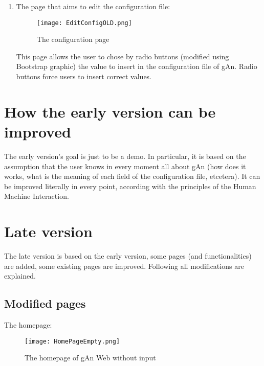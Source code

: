 \begin{enumerate}
\item The page that aims to edit the configuration file:

\begin{figure}[H]
\centering
\texttt{[image: EditConfigOLD.png]} %
\caption{The configuration page}
\end{figure}   

This page allows the user to chose by radio buttons (modified using Bootstrap graphic) the value to insert in the configuration file of gAn. Radio buttons force users to insert correct values.    

\end{enumerate}

\section{How the early version can be improved}
The early version's goal is just to be a demo. In particular, it is based on the assumption that the user knows in every moment all about gAn (how does it works,  what is the meaning of each field of the configuration file, etcetera). It can be improved literally in every point, according with the principles of the Human Machine Interaction.


\section{Late version}

The late version is based on the early version, some pages (and functionalities) are added, some existing pages are improved. Following all modifications are explained.

\subsection{Modified pages}
The homepage:

\begin{figure}[H]
\centering
\texttt{[image: HomePageEmpty.png]} 
\caption{The homepage of gAn Web without input}
\end{figure}


